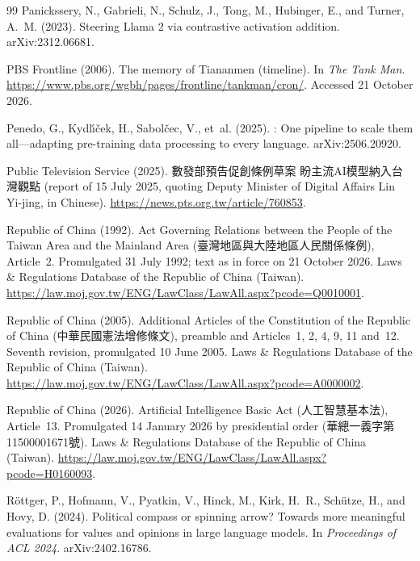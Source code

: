 \documentclass[11pt,a4paper]{article}
\newcommand{\zht}[1]{#1}
\begin{document}
\begin{thebibliography}{99}
Panickssery, N., Gabrieli, N., Schulz, J., Tong, M., Hubinger, E., and Turner, A.~M. (2023).
\newblock Steering {Llama} 2 via contrastive activation addition.
\newblock arXiv:2312.06681.

PBS Frontline (2006).
\newblock The memory of Tiananmen (timeline). In \emph{The Tank Man}.
\newblock \url{https://www.pbs.org/wgbh/pages/frontline/tankman/cron/}. Accessed 21 October 2026.

Penedo, G., Kydl{\'\i}{\v{c}}ek, H., Sabol{\v{c}}ec, V., et~al. (2025).
: One pipeline to scale them all---adapting pre-training data processing to every language.
\newblock arXiv:2506.20920.

Public Television Service (2025).
\newblock \zht{數發部預告促創條例草案 盼主流AI模型納入台灣觀點} (report of 15 July 2025, quoting Deputy Minister of
Digital Affairs Lin Yi-jing, in Chinese).
\newblock \url{https://news.pts.org.tw/article/760853}.

Republic of China (1992).
\newblock Act Governing Relations between the People of the Taiwan Area and the Mainland Area
(\zht{臺灣地區與大陸地區人民關係條例}), Article~2.
\newblock Promulgated 31 July 1992; text as in force on 21 October 2026. Laws \& Regulations Database of the Republic
of China (Taiwan). \url{https://law.moj.gov.tw/ENG/LawClass/LawAll.aspx?pcode=Q0010001}.

Republic of China (2005).
\newblock Additional Articles of the Constitution of the Republic of China (\zht{中華民國憲法增修條文}), preamble
and Articles~1, 2, 4, 9, 11 and~12.
\newblock Seventh revision, promulgated 10 June 2005. Laws \& Regulations Database of the Republic of China (Taiwan).
\url{https://law.moj.gov.tw/ENG/LawClass/LawAll.aspx?pcode=A0000002}.

Republic of China (2026).
\newblock Artificial Intelligence Basic Act (\zht{人工智慧基本法}), Article~13.
\newblock Promulgated 14 January 2026 by presidential order (\zht{華總一義字第11500001671號}). Laws \& Regulations
Database of the Republic of China (Taiwan). \url{https://law.moj.gov.tw/ENG/LawClass/LawAll.aspx?pcode=H0160093}.

R{\"o}ttger, P., Hofmann, V., Pyatkin, V., Hinck, M., Kirk, H.~R., Sch{\"u}tze, H., and Hovy, D. (2024).
\newblock Political compass or spinning arrow? Towards more meaningful evaluations for values and opinions in large
language models.
\newblock In \emph{Proceedings of ACL 2024}. arXiv:2402.16786.


\end{thebibliography}
\end{document}
